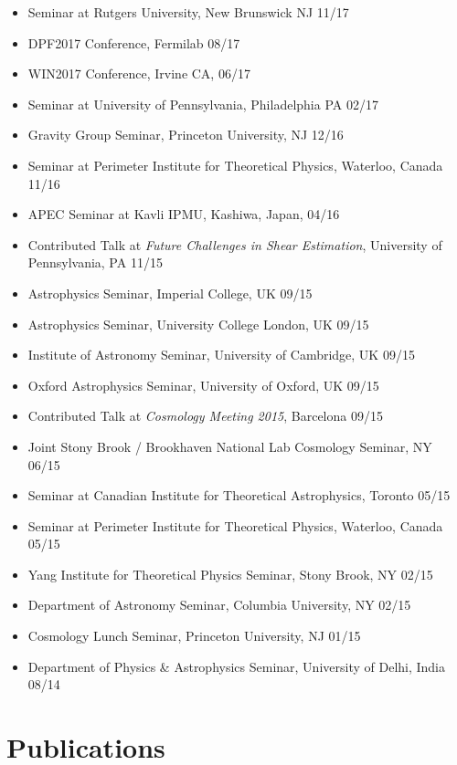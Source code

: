 \documentclass[10pt,margin]{res}
\begin{document}
\begin{resume}
\begin{itemize}
\item Seminar at Rutgers University, New Brunswick NJ 11/17
\item DPF2017 Conference, Fermilab 08/17
\item WIN2017 Conference, Irvine CA, 06/17
\item Seminar at University of Pennsylvania, Philadelphia PA 02/17
\item Gravity Group Seminar, Princeton University, NJ 12/16
\item Seminar at Perimeter Institute for Theoretical Physics, Waterloo, Canada 11/16
\item APEC Seminar at Kavli IPMU, Kashiwa, Japan, 04/16
\item Contributed Talk at {\sl Future Challenges in Shear Estimation}, University of Pennsylvania, PA 11/15
\item Astrophysics Seminar, Imperial College, UK 09/15
\item Astrophysics Seminar, University College London, UK 09/15
\item Institute of Astronomy Seminar, University of Cambridge, UK 09/15
\item Oxford Astrophysics Seminar, University of Oxford, UK 09/15
\item Contributed Talk at {\sl Cosmology Meeting 2015}, Barcelona 09/15
\item Joint Stony Brook / Brookhaven National Lab Cosmology Seminar, NY 06/15
\item Seminar at Canadian Institute for Theoretical Astrophysics, Toronto 05/15
\item Seminar at Perimeter Institute for Theoretical Physics, Waterloo, Canada 05/15
\item Yang Institute for Theoretical Physics Seminar, Stony Brook, NY 02/15
\item Department of Astronomy Seminar, Columbia University, NY 02/15
\item Cosmology Lunch Seminar, Princeton University, NJ 01/15
\item Department of Physics \& Astrophysics Seminar, University of Delhi, India 08/14
\end{itemize}

\section{Publications}


\end{resume}
\end{document}
